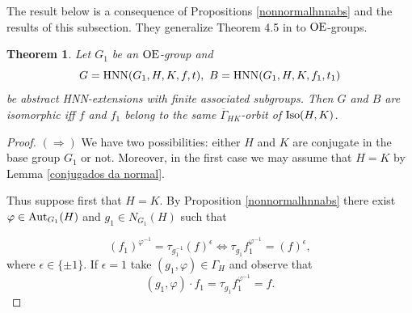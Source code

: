 \documentclass[a4paper,12pt]{article}
\newtheorem{thm}{Theorem}[section]
\def\OE{{\rm OE}}
\def\aut {{\rm Aut}}
\def\hnn {{\rm HNN}}
\def\Iso {{\rm Iso}}
\begin{document}
{%








The result below is a consequence of  Propositions   \ref{nonnormalhnnabs} and the results of this subsection. They generalize Theorem 4.5 in \cite{BZ} to $\OE$-groups. %


\begin{thm} \label{classnonnormalabs} Let $G_1$ be an $\OE$-group and $$G=\hnn(G_1, H, K, f, t),\  B=\hnn(G_1, H, K, f_1, t_1)$$ be  abstract HNN-extensions with finite associated  subgroups. Then $G$ and $B$ are isomorphic iff $f$ and $f_1$ belong to the same $\overline\Gamma_{HK}$-orbit of $\Iso(H, K)$.    
\end{thm}

\begin{proof} 

$(\Rightarrow)$ We have two possibilities: either $H$ and $K$ are conjugate in the base group $G_1$ or  not.  Moreover, in the first case we may assume that $H=K$ by Lemma  \ref{conjugados da normal}.

\medskip
Thus suppose first that $H=K$. By Proposition \ref{nonnormalhnnabs} there  exist $\varphi\in \aut_{G_1}(H)$ and $ g_1 \in N_{G_1}(H)$ such that

$$( f_1)^{\varphi^{-1}}= \tau_{g_1^{-1}} ( f)^{\epsilon} \iff \tau_{g_1}f_1^{\varphi^{-1}}=( f)^{\epsilon},$$
where $\epsilon \in \{\pm 1\}.$ %
If $\epsilon=1$ take $(g_1,\varphi)\in \Gamma_{H}$ and  observe that $$(g_1,\varphi)\cdot f_1=\tau_{g_1}f_1^{\varphi^{-1}}= f.$$


\end{proof}}
\end{document}
